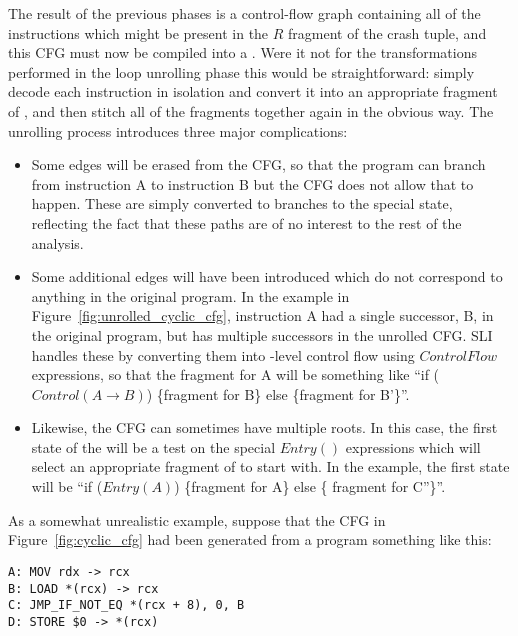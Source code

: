 The result of the previous phases is a control-flow graph containing all of
the instructions which might be present in the $R$ fragment of the
crash tuple, and this CFG must now be compiled into a \StateMachine.
Were it not for the transformations performed in the loop unrolling
phase this would be straightforward: simply decode each instruction in
isolation and convert it into an appropriate fragment of
\StateMachine, and then stitch all of the fragments together again in
the obvious way.  The unrolling process introduces three
major complications:

\begin{itemize}
\item
  Some edges will be erased from the CFG, so that the program can
  branch from instruction A to instruction B but the CFG does not
  allow that to happen.  These are simply converted to branches to the
  special  state, reflecting the fact that these
  paths are of no interest to the rest of the analysis.

\item
  Some additional edges will have been introduced which do not
  correspond to anything in the original program.  In the example in
  Figure~\ref{fig:unrolled_cyclic_cfg}, instruction A had a single
  successor, B, in the original program, but has multiple successors
  in the unrolled CFG.  SLI handles these by converting them into
  \StateMachine-level control flow using $ControlFlow$ expressions, so
  that the {\StateMachine} fragment for A will be something like ``if
  ($Control(A{\rightarrow}B)$) \{fragment for B\} else \{fragment for
  B'\}''.

\item
  Likewise, the CFG can sometimes have multiple roots.  In this case,
  the first state of the {\StateMachine} will be a test on the special
  $Entry()$ expressions which will select an appropriate fragment of
  {\StateMachine} to start with.  In the example, the first state will
  be ``if ($Entry(A)$) \{fragment for A\} else \{ fragment for
  C''\}''.
\end{itemize}

As a somewhat unrealistic example, suppose that the CFG in
Figure~\ref{fig:cyclic_cfg} had been generated from a program
something like this:

\begin{verbatim}
A: MOV rdx -> rcx
B: LOAD *(rcx) -> rcx
C: JMP_IF_NOT_EQ *(rcx + 8), 0, B
D: STORE $0 -> *(rcx)
\end{verbatim}

